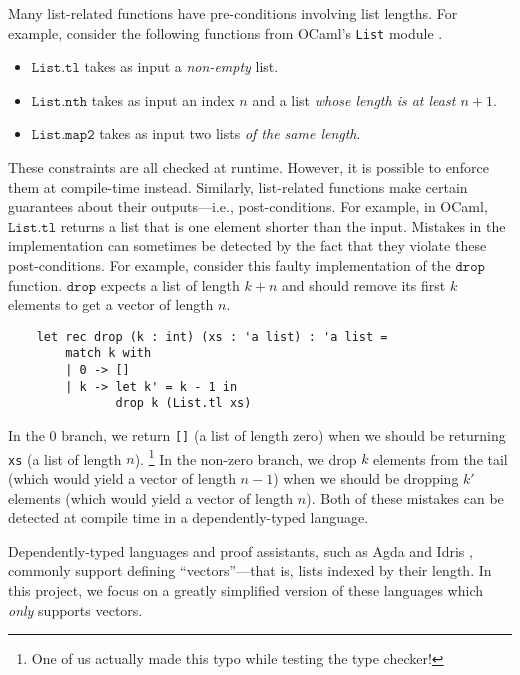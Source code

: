 \documentclass[acmsmall,nonacm]{acmart}
\begin{document}
Many list-related functions have pre-conditions involving list lengths.
For example, consider the following functions from OCaml's \texttt{List} module \cite{ocaml-list}.
\begin{itemize}
    \item $\texttt{List.tl}$ takes as input a \emph{non-empty} list.
    \item $\texttt{List.nth}$ takes as input an index $n$ and a list \emph{whose length is at least $n + 1$}.
    \item $\texttt{List.map2}$ takes as input two lists \emph{of the same length}.
\end{itemize}
These constraints are all checked at runtime.
However, it is possible to enforce them at compile-time instead.
Similarly, list-related functions make certain guarantees about their outputs---i.e., post-conditions.
For example, in OCaml, $\texttt{List.tl}$ returns a list that is one element shorter than the input.
Mistakes in the implementation can sometimes be detected by the fact that they violate these post-conditions.
For example, consider this faulty implementation of the $\texttt{drop}$ function.
$\texttt{drop}$ expects a list of length $k + n$ and should remove its first $k$ elements to get a vector of length $n$.
\begin{lstlisting}
    let rec drop (k : int) (xs : 'a list) : 'a list =
        match k with
        | 0 -> []
        | k -> let k' = k - 1 in
               drop k (List.tl xs)
\end{lstlisting}
In the 0 branch, we return \texttt{[]} (a list of length zero) when we should be returning \texttt{xs} (a list of length $n$).
\footnote{One of us actually made this typo while testing the type checker!}
In the non-zero branch, we drop $k$ elements from the tail (which would yield a vector of length $n - 1$) when we should be dropping $k'$ elements (which would yield a vector of length $n$).
Both of these mistakes can be detected at compile time in a dependently-typed language.

Dependently-typed languages and proof assistants, such as Agda \cite{agda-vec} and Idris \cite{idris-vec}, commonly support defining ``vectors''---that is, lists indexed by their length.
In this project, we focus on a greatly simplified version of these languages which \emph{only} supports vectors.
\end{document}
